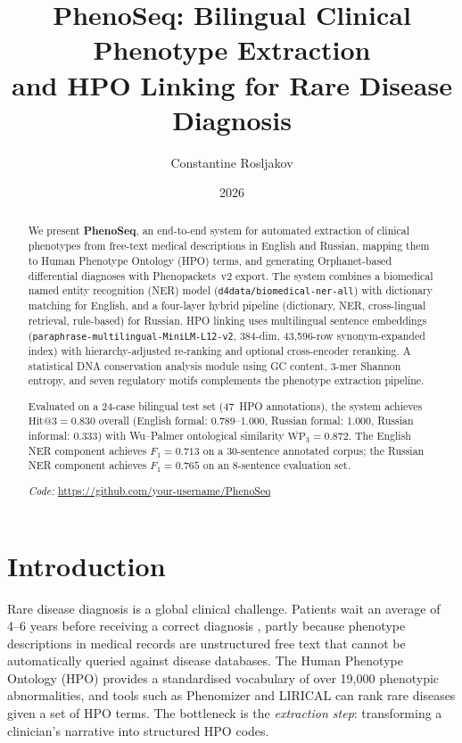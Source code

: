 \documentclass[11pt,a4paper]{article}
\title{\textbf{PhenoSeq: Bilingual Clinical Phenotype Extraction\\
and HPO Linking for Rare Disease Diagnosis}}
\author{Constantine Rosljakov}
\date{2026}
\begin{document}
\maketitle
\thispagestyle{empty}

\begin{abstract}
We present \textbf{PhenoSeq}, an end-to-end system for automated extraction of
clinical phenotypes from free-text medical descriptions in English and Russian,
mapping them to Human Phenotype Ontology (HPO) terms, and generating
Orphanet-based differential diagnoses with Phenopackets~v2 export.  The system
combines a biomedical named entity recognition (NER) model
(\texttt{d4data/biomedical-ner-all}) with dictionary matching for English, and
a four-layer hybrid pipeline (dictionary, NER, cross-lingual retrieval,
rule-based) for Russian.  HPO linking uses multilingual sentence embeddings
(\texttt{paraphrase-multilingual-MiniLM-L12-v2}, 384-dim, 43{,}596-row
synonym-expanded index) with hierarchy-adjusted re-ranking and optional
cross-encoder reranking.  A statistical DNA conservation analysis module using
GC content, 3-mer Shannon entropy, and seven regulatory motifs complements the
phenotype extraction pipeline.

Evaluated on a 24-case bilingual test set (47~HPO annotations), the system
achieves $\text{Hit@3} = 0.830$ overall (English formal: 0.789--1.000, Russian
formal: 1.000, Russian informal: 0.333) with Wu--Palmer ontological similarity
$\overline{\mathrm{WP}}_3 = 0.872$.  The English NER component achieves
$F_1 = 0.713$ on a 30-sentence annotated corpus; the Russian NER component
achieves $F_1 = 0.765$ on an 8-sentence evaluation set.

\noindent\textit{Code:} \url{https://github.com/your-username/PhenoSeq}
\end{abstract}

\newpage
\tableofcontents
\newpage

\section{Introduction}

Rare disease diagnosis is a global clinical challenge.  Patients wait an
average of 4--6 years before receiving a correct diagnosis
\cite{nguengang2020}, partly because phenotype descriptions in medical records
are unstructured free text that cannot be automatically queried against disease
databases.  The Human Phenotype Ontology (HPO) \cite{kohler2021} provides a
standardised vocabulary of over 19{,}000 phenotypic abnormalities, and tools
such as Phenomizer \cite{kohler2009} and LIRICAL \cite{robinson2020} can rank
rare diseases given a set of HPO terms.  The bottleneck is the \emph{extraction
step}: transforming a clinician's narrative into structured HPO codes.
\end{document}
